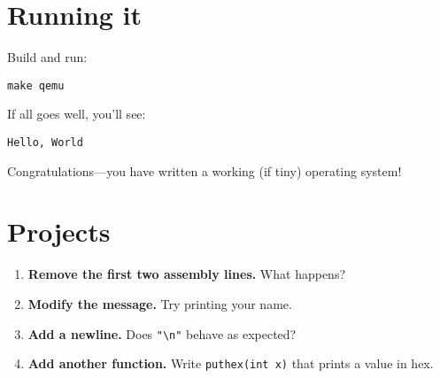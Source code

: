\section*{Running it}

Build and run:
\begin{verbatim}
make qemu
\end{verbatim}

If all goes well, you’ll see:
\begin{verbatim}
Hello, World
\end{verbatim}

Congratulations—you have written a working (if tiny) operating system!

\section*{Projects}

\begin{enumerate}
  \item \textbf{Remove the first two assembly lines.} What happens?
  \item \textbf{Modify the message.} Try printing your name.
  \item \textbf{Add a newline.} Does \texttt{"\textbackslash n"} behave as expected?
  \item \textbf{Add another function.} Write \texttt{puthex(int x)} that prints a value in hex.
\end{enumerate}
